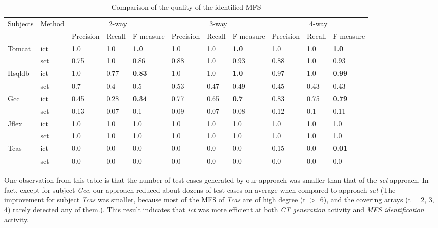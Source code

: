 \documentclass[10pt,journal,compsoc]{IEEEtran}
\begin{document}
\begin{table}[ht]
\centering
\caption{Comparison of the quality of the identified MFS}
\label{cm_elda_fglt}
\begin{tabular}{|ll|lll|lll|lll|}
\hline
\multirow{2}{*}{Subjects} & \multirow{2}{*}{Method} & \multicolumn{3}{c|}{2-way} & \multicolumn{3}{c|}{3-way} & \multicolumn{3}{c|}{4-way} \\ \cline{3-11}
                         &                        & Precision & Recall & F-measure   & Precision & Recall & F-measure & Precision & Recall & F-measure   \\ \hline
Tomcat	&ict	&1.0	&1.0	&\textbf{1.0}	&1.0	&1.0	&\textbf{1.0}	&1.0	&1.0	&\textbf{1.0}	\\
	&sct	&0.75	&1.0	&0.86	&0.88	&1.0	&0.93	&0.88	&1.0	&0.93	\\\hline
Hsqldb	&ict	&1.0	&0.77	&\textbf{0.83}	&1.0	&1.0	&\textbf{1.0}	&0.97	&1.0	&\textbf{0.99}	\\
	&sct	&0.7	&0.4	&0.5	&0.53	&0.47	&0.49	&0.45	&0.43	&0.43	\\\hline
Gcc	&ict	&0.45	&0.28	&\textbf{0.34}	&0.77	&0.65	&\textbf{0.7}	&0.83	&0.75	&\textbf{0.79}	\\
	&sct	&0.13	&0.07	&0.1	&0.09	&0.07	&0.08	&0.12	&0.1	&0.11	\\\hline
Jflex	&ict	&1.0	&1.0	&1.0	&1.0	&1.0	&1.0	&1.0	&1.0	&1.0	\\
	&sct	&1.0	&1.0	&1.0	&1.0	&1.0	&1.0	&1.0	&1.0	&1.0	\\\hline
Tcas	&ict	&0.0	&0.0	&0.0	&0.0	&0.0	&0.0	&0.15	&0.0	&\textbf{0.01}	\\
	&sct	&0.0	&0.0	&0.0	&0.0	&0.0	&0.0	&0.0	&0.0	&0.0	\\\hline
\end{tabular}
\end{table}


One observation from this table is that the number of test cases generated by our approach was smaller than that of the \emph{sct} approach. In fact, except for subject \emph{Gcc}, our approach reduced about dozens of test cases on average when compared to approach \emph{sct}  (The improvement for subject \emph{Tcas} was smaller, because most of the MFS of \emph{Tcas} are of high degree (t $>$ 6), and the covering arrays (t = 2, 3, 4) rarely detected any of them.). This result indicates that \emph{ict} was more efficient at both \emph{CT generation} activity and \emph{MFS identification} activity.
\end{document}
